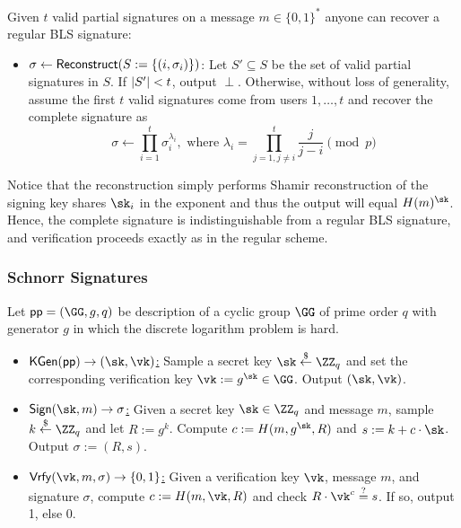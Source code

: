  Given $t$ valid partial signatures on a message $m \in \{0,1\}^*$ anyone can recover a regular BLS signature:

\begin{itemize}
    \item \underline{$\sigma \gets \mathsf{Reconstruct}(S := \{(i, \sigma_i)\})$}: Let $S' \subseteq S$ be the set of valid partial signatures in $S$. If $\lvert S' \rvert < t$, output $\perp$. Otherwise, without loss of generality, assume the first $t$ valid signatures come from users $1, \dots, t$ and recover the complete signature as
    \[
        \sigma \gets \prod_{i=1}^t \sigma_i^{\lambda_i}, \text{ where } \lambda_i = \prod_{j=1,j\neq i}^t \frac{j}{j-i} \pmod{p}
    \]
\end{itemize}

Notice that the reconstruction simply performs Shamir reconstruction of the signing key shares $\sk_i$ in the exponent and thus the output will equal $\blshash(m)^{\sk}$. Hence, the complete signature is indistinguishable from a regular BLS signature, and verification proceeds exactly as in the regular scheme.

\subsubsection{Schnorr Signatures}\label{sec:schnorr}

\begin{construction}
    Let $\pp = (\GG, g, q)$ be description of a cyclic group $\GG$ of prime order $q$ with generator $g$ in which the discrete logarithm problem is hard.
    \begin{itemize}
        \item \underline{$\kgen(\pp) \to (\sk, \vk)$:} Sample a secret key $\sk \sample \ZZ_q$ and set the corresponding verification key $\vk := g^{\sk} \in \GG$. Output $(\sk, \vk)$.
        \item \underline{$\sign(\sk, m) \to \sigma$:} Given a secret key $\sk \in \ZZ_q$ and message $m$, sample $k \sample \ZZ_q$ and let $R := g^k$. Compute $c := H(m, g^\sk, R)$ and $s := k + c \cdot \sk$. Output $\sigma := (R, s)$.
        \item \underline{$\vrfy(\vk, m, \sigma) \to \{0,1\}$:} Given a verification key $\vk$, message $m$, and signature $\sigma$, compute $c := H(m, \vk, R)$ and check $R \cdot \vk^c \stackrel{?}{=} s$. If so, output 1, else 0.
    \end{itemize}
\end{construction}

